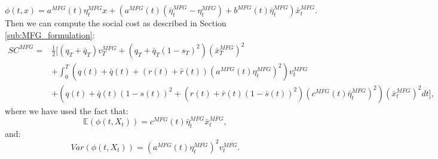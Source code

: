 \documentclass[11pt]{article}
\begin{document}
\begin{equation*}
    \phi(t,x)=a^{MFG}(t)\eta_t^{MFG}x+\left(a^{MFG}(t)(\bar{\eta}_t^{MFG}-\eta_t^{MFG})+b^{MFG}(t)\bar{\eta}_t^{MFG} \right)\bar{x}_t^{MFG}.
\end{equation*}
Then we can compute the social cost as described in Section \ref{sub:MFG_formulation}:
\begin{equation*}
\begin{split}
    SC^{MFG}=&\frac{1}{2}[(q_T+\bar{q}_T)v_T^{MFG}+(q_T+\bar{q}_T(1-s_T)^2)(\bar{x}_T^{MFG})^2\\
    &+\int_0^T (q(t)+\bar{q}(t)+(r(t)+\bar{r}(t))(a^{MFG}(t)\eta_t^{MFG})^2)v_t^{MFG}\\
    &+(q(t)+\bar{q}(t)(1-s(t))^2+(r(t)+\bar{r}(t)(1-\bar{s}(t))^2)(c^{MFG}(t)\bar{\eta}_t^{MFG})^2)(\bar{x}_t^{MFG})^2dt],
\end{split}
\end{equation*}
where we have used the fact that:
\begin{equation*}
    \mathbb{E}(\phi(t,X_t))=c^{MFG}(t)\bar{\eta}_t^{MFG}\bar{x}_t^{MFG},
\end{equation*}
and:
\begin{equation*}
    Var(\phi(t,X_t))=(a^{MFG}(t)\eta_t^{MFG})^2v^{MFG}_t.
\end{equation*}
\end{document}
